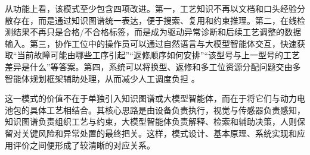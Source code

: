 从功能上看，该模式至少包含四项改进。第一，工艺知识不再以文档和口头经验分散存在，而是通过知识图谱统一表达，便于搜索、复用和约束推理。第二，在线检测结果不再只是合格/不合格标签，而是成为驱动异常诊断和后续工艺调整的数据输入。第三，协作工位中的操作员可以通过自然语言与大模型智能体交互，快速获取“当前故障可能由哪些工序引起”“返修顺序如何安排”“该型号与上一型号的工艺差异是什么”等答案。第四，系统可以将换型、返修和多工位资源分配问题交由多智能体规划框架辅助处理，从而减少人工调度负担 \cite{Massouh2025JIM,Abelha2020RAL,Yao2023JMSY}。

这一模式的价值不在于单独引入知识图谱或大模型智能体，而在于将它们与动力电池包的具体工艺相结合。其核心思路是由设备负责执行，视觉与传感器负责感知，知识图谱负责组织工艺与约束，大模型智能体负责解释、检索和辅助决策，人则保留对关键风险和异常处置的最终把关。这样，模式设计、基本原理、系统实现和应用评价之间便形成了较清晰的对应关系。
